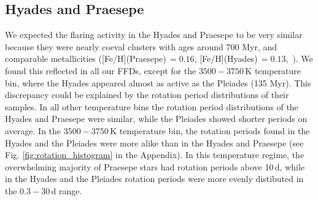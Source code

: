 \documentclass{aa}
\begin{document}
\subsection{Hyades and Praesepe}
We expected the flaring activity in the Hyades and Praesepe to be very similar because they were nearly coeval clusters with ages around 700 Myr, and comparable metallicities ([Fe/H](Praesepe)\,$=0.16$, [Fe/H](Hyades)\,$=0.13$,~\citealt{netopil_metallicities_2016}). We found this reflected in all our FFDs, except for the $3500-3750$\,K temperature bin, where the Hyades appeared almost as active as the Pleiades (135 Myr). This discrepancy could be explained by the rotation period distributions of their samples. In all other temperature bins the rotation period distributions of the Hyades and Praesepe were similar, while the Pleiades showed shorter periods on average. In the $3500-3750$\,K temperature bin, the rotation periods found in the Hyades and the Pleiades were more alike than in the Hyades and Praesepe (see Fig. \ref{fig:rotation_histogram} in the Appendix). In this temperature regime, the overwhelming majority of Praesepe stars had rotation periods above 10\,d, while in the Hyades and the Pleiades rotation periods were more evenly distibuted in the $0.3-30$\,d range.
\end{document}

